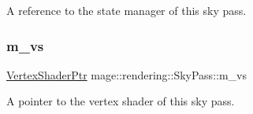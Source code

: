 A reference to the state manager of this sky pass. \mbox{\label{classmage_1_1rendering_1_1_sky_pass_a935019dff57aaf9ae91f974ec59f11ee}} 
\subsubsection{\texorpdfstring{m\+\_\+vs}{m\_vs}}
{\footnotesize\ttfamily \mbox{\hyperlink{namespacemage_1_1rendering_aaf704b9c54a4181f4950a1761de69dda}{Vertex\+Shader\+Ptr}} mage\+::rendering\+::\+Sky\+Pass\+::m\+\_\+vs\hspace{0.3cm}{\ttfamily [private]}}

A pointer to the vertex shader of this sky pass. 
